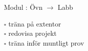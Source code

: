 
    Modul : Övn  $\rightarrow$ Labb 
    \begin{multicols}{3}\SlideFontTiny
    $\square$ träna på extentor \\
$\square$ redovisa projekt \\
$\square$ träna inför muntligt prov \\
    \end{multicols}
    